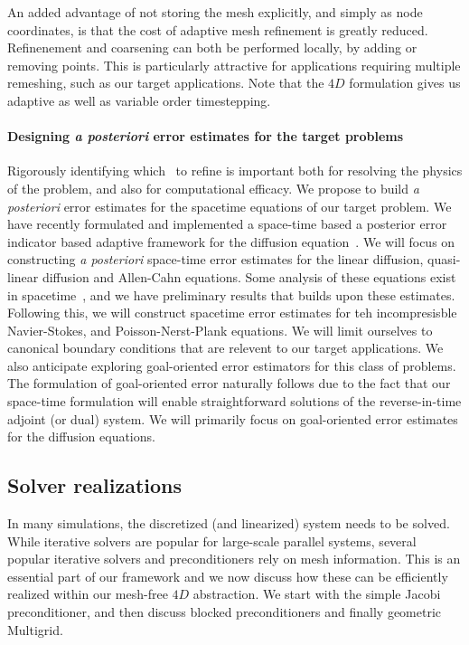 An added advantage of not storing the mesh explicitly, and simply as node coordinates, is that the cost of adaptive mesh refinement is greatly reduced. Refinenement and coarsening can both be performed locally, by adding or removing points. This is particularly attractive for applications requiring multiple remeshing, such as our target applications. Note that the $4D$ formulation gives us adaptive as well as variable order timestepping.

\paragraph{Designing {\it a posteriori} error estimates for the target problems} 
Rigorously identifying which \stri~to refine is important both for resolving the physics of the problem, and also for computational efficacy. We propose to build {\it a posteriori} error estimates for the spacetime equations of our target problem. We have recently formulated and implemented a space-time based a posterior error indicator based adaptive framework for the diffusion equation~\cite{dyja2018parallel}. We will focus on constructing {\it a posteriori} space-time error estimates for the linear diffusion, quasi-linear diffusion and Allen-Cahn equations. Some analysis of these equations exist in spacetime~\cite{verfurth2013posteriori}, and we have preliminary results that builds upon these estimates. Following this, we will construct spacetime error estimates for teh incompresisble Navier-Stokes, and Poisson-Nerst-Plank equations. We will limit ourselves to canonical boundary conditions that are relevent to our target applications. We also anticipate exploring goal-oriented error estimators for this class of problems. The formulation of goal-oriented error naturally follows due to the fact that our space-time
formulation will enable straightforward solutions of the reverse-in-time adjoint (or dual) system. We will primarily focus on goal-oriented error estimates for the diffusion equations.

\subsection{Solver realizations}
\label{s:solver}

In many simulations, the discretized (and linearized) system needs to be solved. While iterative solvers are popular for large-scale parallel systems, several popular iterative solvers and preconditioners rely on mesh information. This is an essential part of our framework and we now discuss how these can be efficiently realized within our mesh-free $4D$ abstraction. We start with the simple Jacobi preconditioner, and then discuss blocked preconditioners and finally geometric Multigrid. %

